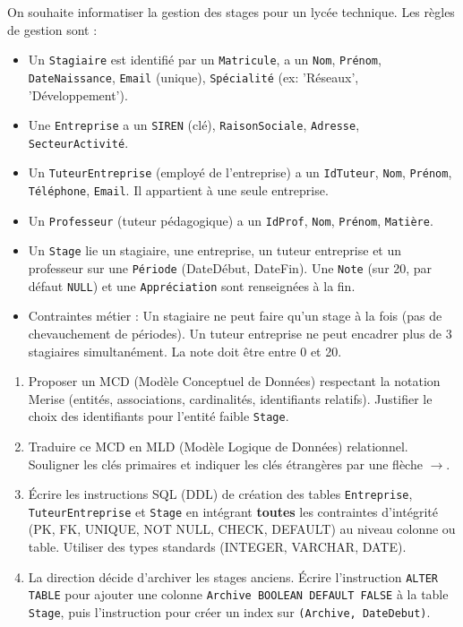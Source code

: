 \documentclass[11pt]{article}
\begin{document}
\begin{exercice}
On souhaite informatiser la gestion des stages pour un lycée technique. Les règles de gestion sont :
\begin{itemize}
    \item Un \texttt{Stagiaire} est identifié par un \texttt{Matricule}, a un \texttt{Nom}, \texttt{Prénom}, \texttt{DateNaissance}, \texttt{Email} (unique), \texttt{Spécialité} (ex: 'Réseaux', 'Développement').
    \item Une \texttt{Entreprise} a un \texttt{SIREN} (clé), \texttt{RaisonSociale}, \texttt{Adresse}, \texttt{SecteurActivité}.
    \item Un \texttt{TuteurEntreprise} (employé de l'entreprise) a un \texttt{IdTuteur}, \texttt{Nom}, \texttt{Prénom}, \texttt{Téléphone}, \texttt{Email}. Il appartient à une seule entreprise.
    \item Un \texttt{Professeur} (tuteur pédagogique) a un \texttt{IdProf}, \texttt{Nom}, \texttt{Prénom}, \texttt{Matière}.
    \item Un \texttt{Stage} lie un stagiaire, une entreprise, un tuteur entreprise et un professeur sur une \texttt{Période} (DateDébut, DateFin). Une \texttt{Note} (sur 20, par défaut \texttt{NULL}) et une \texttt{Appréciation} sont renseignées à la fin.
    \item Contraintes métier : Un stagiaire ne peut faire qu'un stage à la fois (pas de chevauchement de périodes). Un tuteur entreprise ne peut encadrer plus de 3 stagiaires simultanément. La note doit être entre 0 et 20.
\end{itemize}
\begin{enumerate}
    \item Proposer un MCD (Modèle Conceptuel de Données) respectant la notation Merise (entités, associations, cardinalités, identifiants relatifs). Justifier le choix des identifiants pour l'entité faible \texttt{Stage}.
    \item Traduire ce MCD en MLD (Modèle Logique de Données) relationnel. Souligner les clés primaires et indiquer les clés étrangères par une flèche $\rightarrow$.
    \item Écrire les instructions SQL (DDL) de création des tables \texttt{Entreprise}, \texttt{TuteurEntreprise} et \texttt{Stage} en intégrant \textbf{toutes} les contraintes d'intégrité (PK, FK, UNIQUE, NOT NULL, CHECK, DEFAULT) au niveau colonne ou table. Utiliser des types standards (INTEGER, VARCHAR, DATE).
    \item La direction décide d'archiver les stages anciens. Écrire l'instruction \texttt{ALTER TABLE} pour ajouter une colonne \texttt{Archive BOOLEAN DEFAULT FALSE} à la table \texttt{Stage}, puis l'instruction pour créer un index sur \texttt{(Archive, DateDebut)}.
\end{enumerate}
\end{exercice}
\end{document}
